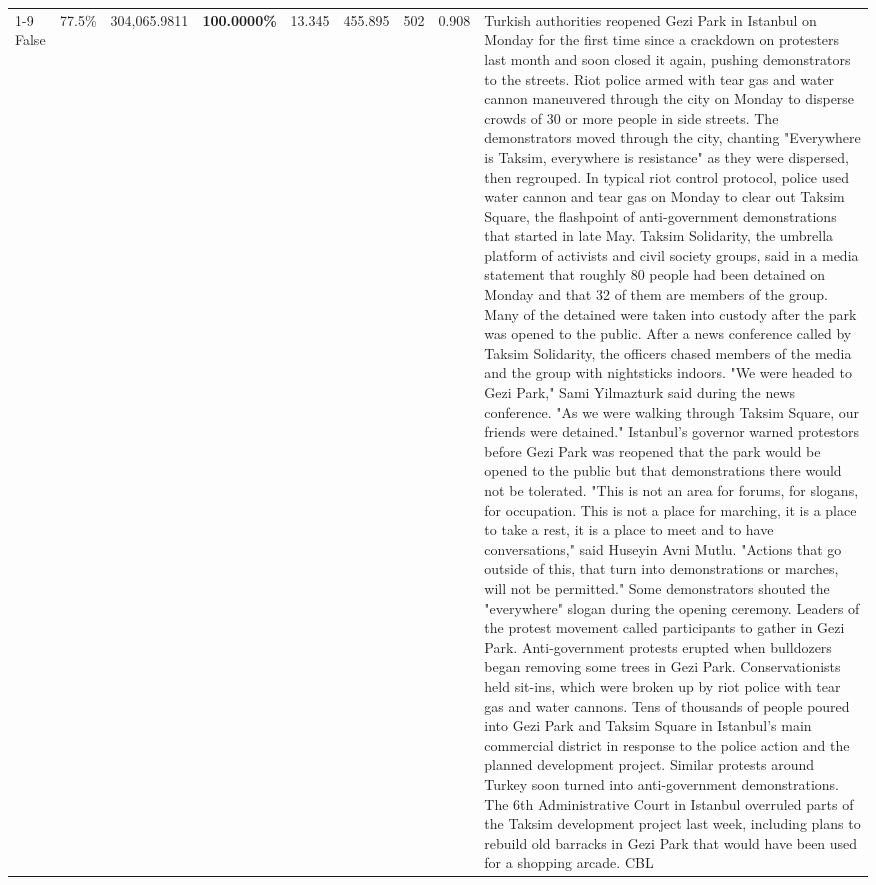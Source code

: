 \begin{table}[H]
\begin{tabular}{lllrlllll}
\cline{1-9}
False & 77.5\% & 304,065.9811 & \bfseries \color{red} 100.0000\% & 13.345 & 455.895 & 502 & 0.908 & Turkish authorities reopened Gezi Park in Istanbul on Monday for the first time since a crackdown on protesters last month and soon closed it again, pushing demonstrators to the streets. Riot police armed with tear gas and water cannon maneuvered through the city on Monday to disperse crowds of 30 or more people in side streets. The demonstrators moved through the city, chanting "Everywhere is Taksim, everywhere is resistance" as they were dispersed, then regrouped. In typical riot control protocol, police used water cannon and tear gas on Monday to clear out Taksim Square, the flashpoint of anti-government demonstrations that started in late May. Taksim Solidarity, the umbrella platform of activists and civil society groups, said in a media statement that roughly 80 people had been detained on Monday and that 32 of them are members of the group. Many of the detained were taken into custody after the park was opened to the public. After a news conference called by Taksim Solidarity, the officers chased members of the media and the group with nightsticks indoors. "We were headed to Gezi Park," Sami Yilmazturk said during the news conference. "As we were walking through Taksim Square, our friends were detained." Istanbul's governor warned protestors before Gezi Park was reopened that the park would be opened to the public but that demonstrations there would not be tolerated. "This is not an area for forums, for slogans, for occupation. This is not a place for marching, it is a place to take a rest, it is a place to meet and to have conversations," said Huseyin Avni Mutlu. "Actions that go outside of this, that turn into demonstrations or marches, will not be permitted." Some demonstrators shouted the "everywhere" slogan during the opening ceremony. Leaders of the protest movement called participants to gather in Gezi Park. Anti-government protests erupted when bulldozers began removing some trees in Gezi Park. Conservationists held sit-ins, which were broken up by riot police with tear gas and water cannons. Tens of thousands of people poured into Gezi Park and Taksim Square in Istanbul's main commercial district in response to the police action and the planned development project. Similar protests around Turkey soon turned into anti-government demonstrations. The 6th Administrative Court in Istanbul overruled parts of the Taksim development project last week, including plans to rebuild old barracks in Gezi Park that would have been used for a shopping arcade. CBL \\

\end{tabular}
\end{table}
